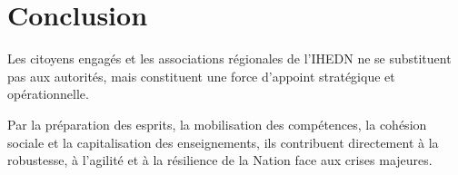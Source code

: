 \documentclass[12pt,a4paper]{article}
\begin{document}
\section{Conclusion}

Les citoyens engagés et les associations régionales de l'IHEDN ne se substituent pas aux autorités, mais constituent une force d'appoint stratégique et opérationnelle.

Par la préparation des esprits, la mobilisation des compétences, la cohésion sociale et la capitalisation des enseignements, ils contribuent directement à la robustesse, à l'agilité et à la résilience de la Nation face aux crises majeures.
\end{document}
